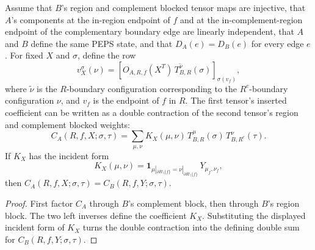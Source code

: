 \begin{theorem}
    \label{thm:peps_region_transfer_coeff_double_factorization}
    \leanok
    Assume that \(B\)'s region and complement blocked tensor maps are injective,
    that \(A\)'s components at the in-region endpoint of \(f\) and at the
    in-complement-region endpoint of the complementary boundary edge are linearly
    independent, that \(A\) and \(B\) define the same PEPS state, and that
    \(D_A(e)=D_B(e)\) for every edge \(e\).
    For fixed \(X\) and \(\sigma\), define the row
    \[
        v_X^\sigma(\nu)
        =
        \left[
            O_{A,R,f}(X^T)\,
            T_{B,R}^{\tilde\nu}(\sigma)
            \right]_{\sigma(v_f)},
    \]
    where \(\tilde\nu\) is the \(R\)-boundary configuration corresponding to the
    \(R^c\)-boundary configuration \(\nu\), and \(v_f\) is the endpoint of \(f\)
    in \(R\).
    The first tensor's inserted coefficient can be written as a double contraction
    of the second tensor's region and complement blocked weights:
    \[
        C_A(R,f,X;\sigma,\tau)
        =
        \sum_{\mu,\nu}
        K_X(\mu,\nu)\,T_{B,R}^{\mu}(\sigma)\,
        T_{B,R^c}^{\nu}(\tau).
    \]
    If \(K_X\) has the incident form
    \[
        K_X(\mu,\nu)=\mathbf 1_{\mu|_{\partial R\setminus\{f\}}
        =\nu|_{\partial R\setminus\{f\}}}\,Y_{\mu_f,\nu_f},
    \]
    then \(C_A(R,f,X;\sigma,\tau)=C_B(R,f,Y;\sigma,\tau)\).
\end{theorem}
\begin{proof}\leanok
    First factor \(C_A\) through \(B\)'s complement block, then through \(B\)'s
    region block.  The two left inverses define the coefficient \(K_X\).  Substituting
    the displayed incident form of \(K_X\) turns the double contraction into the
    defining double sum for \(C_B(R,f,Y;\sigma,\tau)\).
\end{proof}


